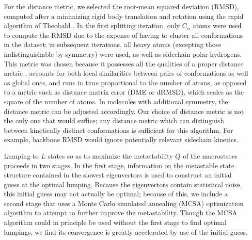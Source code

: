 For the distance metric, we selected the root-mean squared deviation (RMSD), computed after a minimizing rigid body translation and rotation using the rapid algorithm of Theobald \cite{theobald:2005a}.
In the first splitting iteration, only C$_\alpha$ atoms were used to compute the RMSD due to the expense of having to cluster all conformations in the dataset; in subsequent iterations, all heavy atoms (excepting those indistinguishable by symmetry) were used, as well as sidechain polar hydrogens.
This metric was chosen because it possesses all the qualities of a proper distance metric \cite{steipe:2002a}, accounts for both local similarities between pairs of conformations as well as global ones, and runs in time proportional to the number of atoms, as opposed to a metric such as distance matrix error (DME or dRMSD), which scales as the square of the number of atoms.  
In molecules with additional symmetry, the distance metric can be adjusted accordingly.
Our choice of distance metric is not the only one that would suffice; any distance metric which can distinguish between kinetically distinct conformations is sufficient for this algorithm.
For example, backbone RMSD would ignore potentially relevant sidechain kinetics.

Lumping to $L$ states so as to maximize the metastability $Q$ of the macrostates proceeds in two stages.
In the first stage, information on the metastable state structure contained in the slowest eigenvectors \cite{schuette-thesis,huisinga-thesis,deuflhard:2000a,schuette:2002b} is used to construct an initial guess at the optimal lumping.
Because the eigenvectors contain statistical noise, this initial guess may not actually be optimal; because of this, we include a second stage that uses a Monte Carlo simulated annealing (MCSA) optimization algorithm to attempt to further improve the metastability.
Though the MCSA algorithm could in principle be used without the first stage to find optimal lumpings, we find its convergence is greatly accelerated by use of the initial guess.

